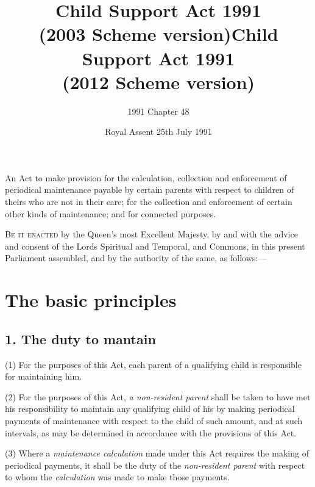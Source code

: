 \documentclass[12pt,a4paper]{article}
\title{\regstitle}
\title{Child Support Act 1991\\ (2003 Scheme version)}
\title{Child Support Act 1991\\ (2012 Scheme version)}
\author{1991 Chapter 48}
\date{Royal Assent 25th July 1991}
\begin{document}
\maketitle

\noindent
{\large An Act to make provision for the calculation, collection and enforcement of periodical maintenance payable by certain parents with respect to children of theirs who are not in their care; for the collection and enforcement of certain other kinds of maintenance; and for connected purposes.}


\bigskip

\lettrine{B}{e it enacted} by the Queen’s most Excellent Majesty, by and with the advice and consent of the Lords Spiritual and Temporal, and Commons, in this present Parliament assembled, and by the authority of the same, as follows:—


{\sloppy

\tableofcontents

}

\setcounter{secnumdepth}{-2}

\section{The basic principles}

\subsection{1. The duty to mantain}

(1) For the purposes of this Act, each parent of a qualifying child is
responsible for maintaining him.

(2) For the purposes of this Act, \emph{a non-resident parent} shall be
taken to have met his responsibility to maintain any qualifying child of his by making
periodical payments of maintenance with respect to the child of such amount, and at
such intervals, as may be determined in accordance with the provisions of this Act.

(3) Where a \emph{maintenance calculation} made under this
Act requires the making of periodical payments, it shall be the duty of the \emph{non-resident parent} with respect to whom the \emph{calculation} was
made to make those payments.
\end{document}
